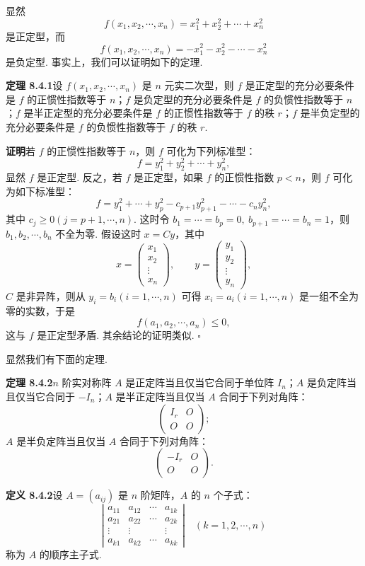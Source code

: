 \documentclass[UTF8,12pt,a4paper,fontset=fandol]{ctexart}
\begin{document}
显然
\[
f(x_1,x_2,\cdots,x_n)=x_1^2+x_2^2+\cdots+x_n^2
\]
是正定型，而
\[
f(x_1,x_2,\cdots,x_n)=-x_1^2-x_2^2-\cdots-x_n^2
\]
是负定型. 事实上，我们可以证明如下的定理.

\noindent\textbf{定理 8.4.1}\quad 设 $f(x_1,x_2,\cdots,x_n)$ 是 $n$ 元实二次型，则 $f$ 是正定型的充分必要条件是 $f$ 的正惯性指数等于 $n$；$f$ 是负定型的充分必要条件是 $f$ 的负惯性指数等于 $n$；$f$ 是半正定型的充分必要条件是 $f$ 的正惯性指数等于 $f$ 的秩 $r$；$f$ 是半负定型的充分必要条件是 $f$ 的负惯性指数等于 $f$ 的秩 $r$.

\noindent\textbf{证明}\quad 若 $f$ 的正惯性指数等于 $n$，则 $f$ 可化为下列标准型：
\[
f=y_1^2+y_2^2+\cdots+y_n^2,
\]
显然 $f$ 是正定型. 反之，若 $f$ 是正定型，如果 $f$ 的正惯性指数 $p<n$，则 $f$ 可化为如下标准型：
\begin{equation}
f=y_1^2+\cdots+y_p^2-c_{p+1}y_{p+1}^2-\cdots-c_ny_n^2,
\tag{8.4.1}
\end{equation}
其中 $c_j\geq 0(j=p+1,\cdots,n)$. 这时令 $b_1=\cdots=b_p=0,\ b_{p+1}=\cdots=b_n=1$，则 $b_1,b_2,\cdots,b_n$ 不全为零. 假设这时 $x=Cy$，其中
\[
x=\left(\begin{array}{c}x_1\\x_2\\ \vdots\\x_n\end{array}\right),\qquad
y=\left(\begin{array}{c}y_1\\y_2\\ \vdots\\y_n\end{array}\right),
\]
$C$ 是非异阵，则从 $y_i=b_i(i=1,\cdots,n)$ 可得 $x_i=a_i(i=1,\cdots,n)$ 是一组不全为零的实数，于是
\[
f(a_1,a_2,\cdots,a_n)\leq 0,
\]
这与 $f$ 是正定型矛盾. 其余结论的证明类似. $\square$

显然我们有下面的定理.

\noindent\textbf{定理 8.4.2}\quad $n$ 阶实对称阵 $A$ 是正定阵当且仅当它合同于单位阵 $I_n$；$A$ 是负定阵当且仅当它合同于 $-I_n$；$A$ 是半正定阵当且仅当 $A$ 合同于下列对角阵：
\[
\left(\begin{array}{cc}I_r&O\\ O&O\end{array}\right);
\]
$A$ 是半负定阵当且仅当 $A$ 合同于下列对角阵：
\[
\left(\begin{array}{cc}-I_r&O\\ O&O\end{array}\right).
\]

\noindent\textbf{定义 8.4.2}\quad 设 $A=(a_{ij})$ 是 $n$ 阶矩阵，$A$ 的 $n$ 个子式：
\[
\left|\begin{array}{cccc}
a_{11}&a_{12}&\cdots&a_{1k}\\
a_{21}&a_{22}&\cdots&a_{2k}\\
\vdots&\vdots&&\vdots\\
a_{k1}&a_{k2}&\cdots&a_{kk}
\end{array}\right|\quad (k=1,2,\cdots,n)
\]
称为 $A$ 的顺序主子式.
\end{document}
